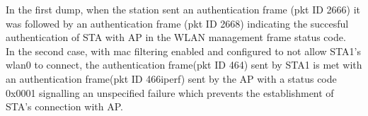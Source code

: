 In the first dump, when the station sent an authentication frame (pkt ID 2666) it was
followed by an authentication frame (pkt ID 2668) indicating the succesful authentication
of STA with AP in the WLAN management frame status code.\\
In the second case, with mac filtering enabled and configured to not allow STA1's wlan0 to connect,
the authentication frame(pkt ID 464) sent by STA1 is met with an authentication frame(pkt ID 466iperf) sent by the AP
with a status code 0x0001 signalling an unspecified failure which prevents the establishment of STA's connection with AP.
